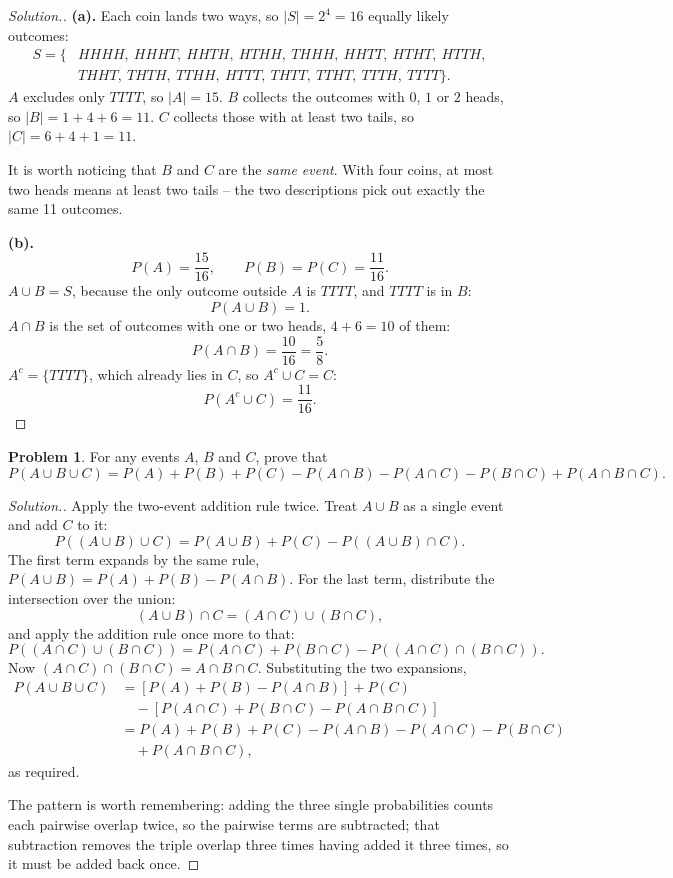 \documentclass[12pt,a4paper]{report}
\theoremstyle{definition}
\theoremstyle{plain}
\theoremstyle{definition}
\newtheorem{problemx}{Problem}[section]
\newenvironment{problem}{\begin{problemx}}{\end{problemx}}
\newenvironment{solution}
  {\renewcommand{\qedsymbol}{}\begin{proof}[\textit{Solution}.]}
  {\end{proof}}
\begin{document}
\begin{solution}
\textbf{(a).} Each coin lands two ways, so $|S| = 2^4 = 16$ equally likely outcomes:
\begin{align*}
S = \{&HHHH,\ HHHT,\ HHTH,\ HTHH,\ THHH,\ HHTT,\ HTHT,\ HTTH,\\
      &THHT,\ THTH,\ TTHH,\ HTTT,\ THTT,\ TTHT,\ TTTH,\ TTTT\}.
\end{align*}
$A$ excludes only $TTTT$, so $|A| = 15$. $B$ collects the outcomes with $0$, $1$ or $2$
heads, so $|B| = 1+4+6 = 11$. $C$ collects those with at least two tails, so
$|C| = 6+4+1 = 11$.

It is worth noticing that $B$ and $C$ are the \emph{same event}. With four coins, at most
two heads means at least two tails -- the two descriptions pick out exactly the same 11
outcomes.

\textbf{(b).} \[P(A) = \frac{15}{16},\qquad P(B) = P(C) = \frac{11}{16}.\]
$A\cup B = S$, because the only outcome outside $A$ is $TTTT$, and $TTTT$ is in $B$:
\[P(A\cup B) = 1.\]
$A\cap B$ is the set of outcomes with one or two heads, $4+6 = 10$ of them:
\[P(A\cap B) = \frac{10}{16} = \frac{5}{8}.\]
$A^c = \{TTTT\}$, which already lies in $C$, so $A^c\cup C = C$:
\[P(A^c\cup C) = \frac{11}{16}.\]
\end{solution}

\begin{problem}
For any events $A$, $B$ and $C$, prove that
\[P(A\cup B\cup C) = P(A)+P(B)+P(C)-P(A\cap B)-P(A\cap C)-P(B\cap C)+P(A\cap B\cap C).\]
\end{problem}

\begin{solution}
Apply the two-event addition rule twice. Treat $A\cup B$ as a single event and add $C$ to
it:
\[P((A\cup B)\cup C) = P(A\cup B) + P(C) - P((A\cup B)\cap C).\]
The first term expands by the same rule, $P(A\cup B) = P(A)+P(B)-P(A\cap B)$. For the
last term, distribute the intersection over the union:
\[(A\cup B)\cap C = (A\cap C)\cup(B\cap C),\]
and apply the addition rule once more to that:
\[P((A\cap C)\cup(B\cap C)) = P(A\cap C)+P(B\cap C)-P((A\cap C)\cap(B\cap C)).\]
Now $(A\cap C)\cap(B\cap C) = A\cap B\cap C$. Substituting the two expansions,
\begin{align*}
P(A\cup B\cup C) &= [P(A)+P(B)-P(A\cap B)] + P(C)\\
&\quad - [P(A\cap C)+P(B\cap C)-P(A\cap B\cap C)]\\
&= P(A)+P(B)+P(C)-P(A\cap B)-P(A\cap C)-P(B\cap C)\\
&\quad +P(A\cap B\cap C),
\end{align*}
as required.

The pattern is worth remembering: adding the three single probabilities counts each
pairwise overlap twice, so the pairwise terms are subtracted; that subtraction removes
the triple overlap three times having added it three times, so it must be added back
once.
\end{solution}
\end{document}
